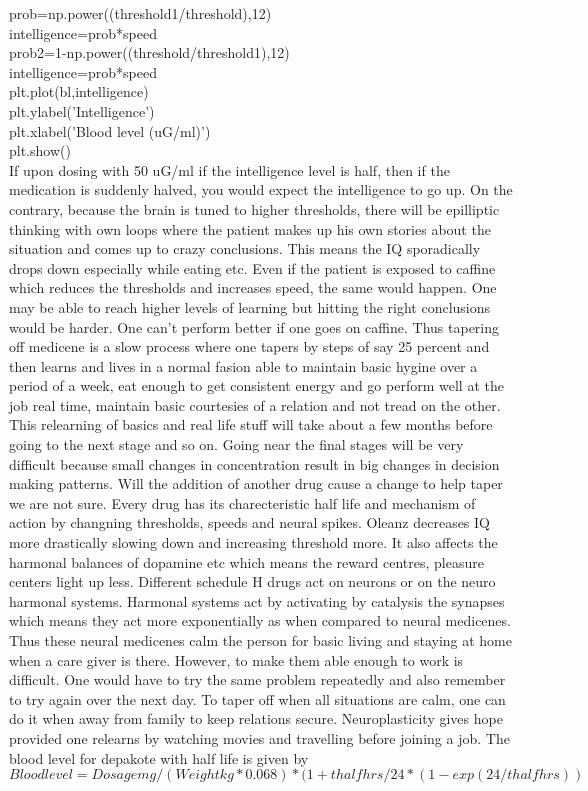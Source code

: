 \documentclass[a4paper]{article}
\begin{document}
prob=np.power((threshold1/threshold),12)\\
intelligence=prob*speed\\
prob2=1-np.power((threshold/threshold1),12)\\
intelligence=prob*speed\\

plt.plot(bl,intelligence)\\
plt.ylabel('Intelligence')\\
plt.xlabel('Blood level (uG/ml)')\\
plt.show()\\

If upon dosing with 50 uG/ml if the intelligence level is half, then if the medication is suddenly halved,
you would expect the intelligence to go up. On the contrary, because the brain is tuned to higher thresholds, there will be epilliptic thinking with own loops where the patient makes up his own stories about the situation and comes up to crazy conclusions. This means the IQ sporadically drops down especially while eating etc. Even if the patient is exposed to caffine which reduces the thresholds and increases speed, the same would happen. One may be able to reach higher levels of learning but hitting the right conclusions would be harder. One can't perform better if one goes on caffine. Thus tapering off medicene is a slow process where one tapers by steps of say 25 percent and then learns and lives in a normal fasion able to maintain basic hygine over a period of a week, eat enough to get consistent energy and go perform well at the job real time, maintain basic courtesies of a relation and not tread on the other. This relearning of basics and real life stuff will take about a few months before going to the next stage and so on. Going near the final stages will be very difficult because small changes in concentration result in big changes in decision making patterns. Will the addition of another drug cause a change to help taper we are not sure. Every drug has its charecteristic half life and mechanism of action by changning thresholds, speeds and neural spikes. Oleanz decreases IQ more drastically slowing down and increasing threshold more. It also affects the harmonal balances of dopamine etc which means the reward centres, pleasure centers light up less. Different schedule H drugs act on neurons or on the neuro harmonal systems. Harmonal systems act by activating by catalysis the synapses which means they act more exponentially as when compared to neural medicenes. Thus these neural medicenes calm the person for basic living and staying at home when a care giver is there. However, to make them able enough to work is difficult. One would have to try the same problem repeatedly and also remember to try again over the next day. To taper off when all situations are calm, one can do it when away from family to keep relations secure. Neuroplasticity gives hope provided one relearns by watching movies and travelling before joining a job. The blood level for depakote with half life is given by
$$Bloodlevel=Dosagemg/(Weightkg*0.068)*(1+thalfhrs/24*(1-exp(24/thalfhrs))$$
\end{document}
